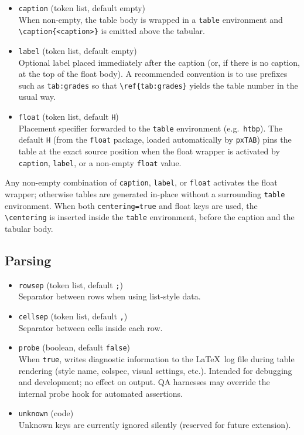 \documentclass[11pt,a4paper]{article}
\begin{document}
\begin{itemize}
  \item \texttt{caption} (token list, default empty)\\
    When non-empty, the table body is wrapped in a \texttt{table}
    environment and \verb|\caption{<caption>}| is emitted above the
    tabular.

  \item \texttt{label} (token list, default empty)\\
    Optional label placed immediately after the caption (or, if there is
    no caption, at the top of the float body).  A recommended convention
    is to use prefixes such as \texttt{tab:grades} so that
    \verb|\ref{tab:grades}| yields the table number in the usual way.

  \item \texttt{float} (token list, default \texttt{H})\\
    Placement specifier forwarded to the \texttt{table} environment
    (e.g.\ \texttt{htbp}).  The default \texttt{H} (from the
    \texttt{float} package, loaded automatically by \texttt{pxTAB})
    pins the table at the exact source position when the float wrapper
    is activated by \texttt{caption}, \texttt{label}, or a non-empty
    \texttt{float} value.
\end{itemize}

Any non-empty combination of \texttt{caption}, \texttt{label}, or
\texttt{float} activates the float wrapper; otherwise tables are
generated in-place without a surrounding \texttt{table} environment.
When both \texttt{centering=true} and float keys are used, the
\verb|\centering| is inserted inside the \texttt{table} environment,
before the caption and the tabular body.

\subsection*{Parsing}

\begin{itemize}
  \item \texttt{rowsep} (token list, default \texttt{;})\\
    Separator between rows when using list-style data.

  \item \texttt{cellsep} (token list, default \texttt{,})\\
    Separator between cells inside each row.

  \item \texttt{probe} (boolean, default \texttt{false})\\
    When \texttt{true}, writes diagnostic information to the \LaTeX\ log
    file during table rendering (style name, colspec, visual settings,
    etc.).  Intended for debugging and development; no effect on
    output.  QA harnesses may override the internal probe hook for
    automated assertions.

  \item \texttt{unknown} (code)\\
    Unknown keys are currently ignored silently (reserved for future
    extension).
\end{itemize}
\end{document}
